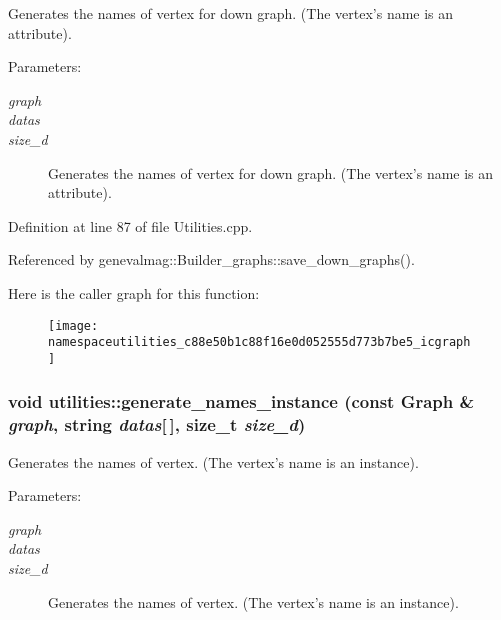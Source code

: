Generates the names of vertex for down graph. (The vertex's name is an attribute). \begin{Desc}
\item[Parameters:]
\begin{description}
\item[{\em graph}]\item[{\em datas}]\item[{\em size\_\-d}]Generates the names of vertex for down graph. (The vertex's name is an attribute). \end{description}
\end{Desc}


Definition at line 87 of file Utilities.cpp.

Referenced by genevalmag::Builder\_\-graphs::save\_\-down\_\-graphs().

Here is the caller graph for this function:\nopagebreak
\begin{figure}[H]
\begin{center}
\leavevmode
\texttt{[image: namespaceutilities\_c88e50b1c88f16e0d052555d773b7be5\_icgraph]}
\end{center}
\end{figure}
\hypertarget{namespaceutilities_0e49bfde1f01bb5567770fc492e6929f}{
\subsubsection[{generate\_\-names\_\-instance}]{\setlength{\rightskip}{0pt plus 5cm}void utilities::generate\_\-names\_\-instance (const Graph \& {\em graph}, \/  string {\em datas}\mbox{[}$\,$\mbox{]}, \/  size\_\-t {\em size\_\-d})}}
\label{namespaceutilities_0e49bfde1f01bb5567770fc492e6929f}


Generates the names of vertex. (The vertex's name is an instance). \begin{Desc}
\item[Parameters:]
\begin{description}
\item[{\em graph}]\item[{\em datas}]\item[{\em size\_\-d}]Generates the names of vertex. (The vertex's name is an instance). \end{description}
\end{Desc}


